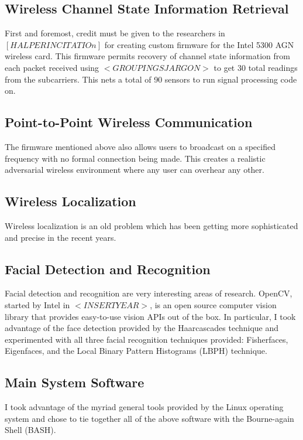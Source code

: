 \documentclass[12pt]{report}
\begin{document}
\subsection{Wireless Channel State Information Retrieval}
First and foremost, credit must be given to the researchers in $[HALPERIN CITATIOn]$ for creating custom firmware for the Intel 5300 AGN wireless card. This firmware permits recovery of channel state information from each packet received using $<GROUPINGS JARGON>$ to get 30 total readings from the subcarriers. This nets a total of 90 sensors to run signal processing code on. \\

\subsection{Point-to-Point Wireless Communication}
The firmware mentioned above also allows users to broadcast on a specified frequency with no formal connection being made. This creates a realistic adversarial wireless environment where any user can overhear any other. \\

\subsection{Wireless Localization}
Wireless localization is an old problem which has been getting more sophisticated and precise in the recent years. \\

\subsection{Facial Detection and Recognition}
Facial detection and recognition are very interesting areas of research. OpenCV, started by Intel in $<INSERT YEAR>$, is an open source computer vision library that provides easy-to-use vision APIs out of the box. In particular, I took advantage of the face detection provided by the Haarcascades technique and experimented with all three facial recognition techniques provided: Fisherfaces, Eigenfaces, and the Local Binary Pattern Histograms (LBPH) technique. \\

\subsection{Main System Software}
I took advantage of the myriad general tools provided by the Linux operating system and chose to tie together all of the above software with the Bourne-again Shell (BASH). \\
\end{document}

